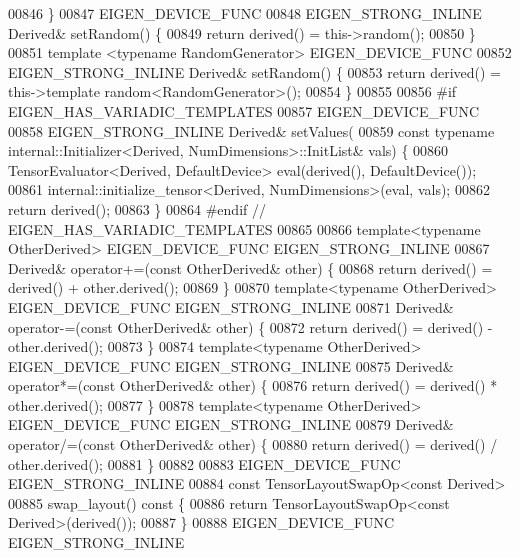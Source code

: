 \begin{DoxyCode}
00846     \}
00847     EIGEN\_DEVICE\_FUNC
00848     EIGEN\_STRONG\_INLINE Derived& setRandom() \{
00849       \textcolor{keywordflow}{return} derived() = this->random();
00850     \}
00851     \textcolor{keyword}{template} <\textcolor{keyword}{typename} RandomGenerator> EIGEN\_DEVICE\_FUNC
00852     EIGEN\_STRONG\_INLINE Derived& setRandom() \{
00853       \textcolor{keywordflow}{return} derived() = this->\textcolor{keyword}{template} random<RandomGenerator>();
00854     \}
00855 
00856 \textcolor{preprocessor}{#if EIGEN\_HAS\_VARIADIC\_TEMPLATES}
00857     EIGEN\_DEVICE\_FUNC
00858     EIGEN\_STRONG\_INLINE Derived& setValues(
00859         \textcolor{keyword}{const} \textcolor{keyword}{typename} internal::Initializer<Derived, NumDimensions>::InitList& vals) \{
00860       TensorEvaluator<Derived, DefaultDevice> eval(derived(), DefaultDevice());
00861       internal::initialize\_tensor<Derived, NumDimensions>(eval, vals);
00862       \textcolor{keywordflow}{return} derived();
00863     \}
00864 \textcolor{preprocessor}{#endif  // EIGEN\_HAS\_VARIADIC\_TEMPLATES}
00865 
00866     \textcolor{keyword}{template}<\textcolor{keyword}{typename} OtherDerived> EIGEN\_DEVICE\_FUNC EIGEN\_STRONG\_INLINE
00867     Derived& operator+=(\textcolor{keyword}{const} OtherDerived& other) \{
00868       \textcolor{keywordflow}{return} derived() = derived() + other.derived();
00869     \}
00870     \textcolor{keyword}{template}<\textcolor{keyword}{typename} OtherDerived> EIGEN\_DEVICE\_FUNC EIGEN\_STRONG\_INLINE
00871     Derived& operator-=(\textcolor{keyword}{const} OtherDerived& other) \{
00872       \textcolor{keywordflow}{return} derived() = derived() - other.derived();
00873     \}
00874     \textcolor{keyword}{template}<\textcolor{keyword}{typename} OtherDerived> EIGEN\_DEVICE\_FUNC EIGEN\_STRONG\_INLINE
00875     Derived& operator*=(\textcolor{keyword}{const} OtherDerived& other) \{
00876       \textcolor{keywordflow}{return} derived() = derived() * other.derived();
00877     \}
00878     \textcolor{keyword}{template}<\textcolor{keyword}{typename} OtherDerived> EIGEN\_DEVICE\_FUNC EIGEN\_STRONG\_INLINE
00879     Derived& operator/=(\textcolor{keyword}{const} OtherDerived& other) \{
00880       \textcolor{keywordflow}{return} derived() = derived() / other.derived();
00881     \}
00882 
00883     EIGEN\_DEVICE\_FUNC EIGEN\_STRONG\_INLINE
00884     \textcolor{keyword}{const} TensorLayoutSwapOp<const Derived>
00885     swap\_layout()\textcolor{keyword}{ const }\{
00886       \textcolor{keywordflow}{return} TensorLayoutSwapOp<const Derived>(derived());
00887     \}
00888     EIGEN\_DEVICE\_FUNC EIGEN\_STRONG\_INLINE

\end{DoxyCode}
